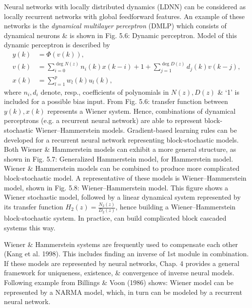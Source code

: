 \documentclass{article}
\begin{document}
\begin{enumerate}
\begin{itemize}
\begin{itemize}
\begin{itemize}
				Neural networks with locally distributed dynamics (LDNN) can be considered as locally recurrent networks with global feedforward features. An example of these networks is the {\it dynamical multilayer perceptron} (DMLP) which consists of dynamical neurons \& is shown in {\sf Fig. 5.6: Dynamic perceptron}. Model of this dynamic perceptron is described by
				\begin{align}
					y(k) &= \Phi(v(k)),\\
					v(k) &= \sum_{i=0}^{\deg N(z)} n_i(k)x(k - i) + 1 + \sum_{j=1}^{\deg D(z)} d_j(k)v(k - j),\\
					x(k) &= \sum_{l=1}^p w_l(k)u_l(k),
				\end{align}
				where $n_i,d_i$ denote, resp., coefficients of polynomials in $N(z),D(z)$ \& `1' is included for a possible bias input. From Fig. 5.6: transfer function between $y(k),x(k)$ represents a Wiener system. Hence, combinations of dynamical perceptrons (e.g. a recurrent neural network) are able to represent block-stochastic Wiener--Hammerstein models. Gradient-based learning rules can be developed for a recurrent neural network representing block-stochastic models. Both Wiener \& Hammerstein models can exhibit a more general structure, as shown in {\sf Fig. 5.7: Generalized Hammerstein model}, for Hammerstein model. Wiener \& Hammerstein models can be combined to produce more complicated block-stochastic model. A representative of these models is Wiener--Hammerstein model, shown in {\sf Fig. 5.8: Wiener--Hammerstein model}. This figure shows a Wiener stochastic model, followed by a linear dynamical system represented by its transfer function $H_2(z) = \frac{N_2(z)}{D_2(z)}$, hence building a Wiener--Hammerstein block-stochastic system. In practice, can build complicated block cascaded systems this way.
				
				Wiener \& Hammerstein systems are frequently used to compensate each other (Kang et al. 1998). This includes finding an inverse of 1st module in combination. If these models are represented by neural networks, Chap. 4 provides a general framework for uniqueness, existence, \& convergence of inverse neural models. Following example from Billings \& Voon (1986) shows: Wiener model can be represented by a NARMA model, which, in turn can be modeled by a recurrent neural network.
				

\end{itemize}
\end{itemize}
\end{itemize}
\end{enumerate}
\end{document}

